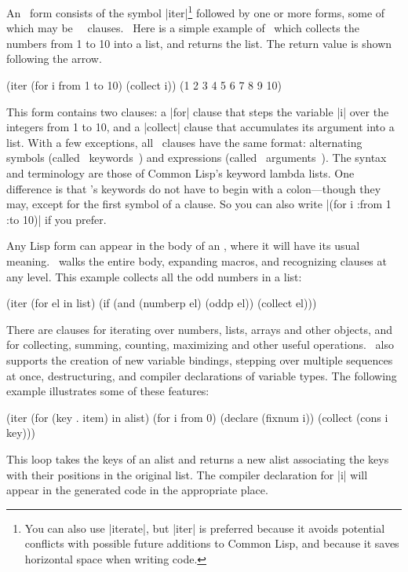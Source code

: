 An \iter\ form consists of the symbol |iter|\footnote{You can also use
|iterate|, but |iter| is preferred because it avoids potential conflicts with
possible future additions to Common Lisp, and because it saves
horizontal space when writing code.}
followed by one or more
forms, some of which may be \iter\ 
~clauses.~  Here is a simple example of \iter\ which collects the
numbers from 1 to 10 into a list, and returns the list.  The return
value is shown following the arrow.
\begin{program}
(iter (for i from 1 to 10)
      (collect i))          \yields (1 2 3 4 5 6 7 8 9 10)
\end{program}
This form contains two clauses: a |for| clause that steps the
variable |i| over the integers from 1 to 10, and a |collect|
clause that accumulates its argument into a list.  With a few
exceptions, all \iter\ clauses have the same format: alternating
symbols (called ~keywords~) and expressions (called
~arguments~).  The syntax and terminology are those of Common
Lisp's keyword lambda lists.  One difference is that \iter's keywords
do not have to begin with a colon---though they may, except for the
first symbol of a clause.  So you can also write  |(for i :from
1 :to 10)| if you prefer.

Any Lisp form can appear in the body of an \iter, where it will have
its usual meaning.  \iter\ walks the entire body, expanding macros,
and recognizing clauses at any level.  This example collects all the
odd numbers in a list:
\begin{program}
(iter (for el in list)
      (if (and (numberp el) (oddp el))
          (collect el)))
\end{program}

There are clauses for iterating over numbers, lists, arrays and other
objects, and for
collecting, summing, counting, maximizing and other useful operations.
\iter\ also supports the creation of new variable bindings, stepping
over multiple sequences at once, destructuring, and compiler
declarations of variable types.  The following example illustrates
some of these features: 
\begin{program}
(iter (for (key . item) in alist)
         (for i from 0)
         (declare (fixnum i))
         (collect (cons i key)))
\end{program}

This loop takes the keys of an alist and returns a new alist
associating the keys with their positions in the original list. The
compiler declaration for |i| will appear in the generated code
in the appropriate place.

